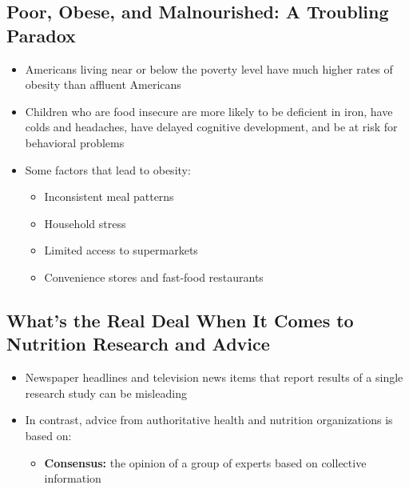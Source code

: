 \documentclass[12pt]{article}
\begin{document}
        \subsection{Poor, Obese, and Malnourished: A Troubling Paradox}
            \begin{itemize}
                \item Americans living near or below the poverty level have much higher rates of obesity than affluent Americans
                \item Children who are food insecure are more likely to be deficient in iron, have colds and headaches, have delayed cognitive development, and be at risk for behavioral problems
                \item Some factors that lead to obesity:
                    \begin{itemize}
                        \item Inconsistent meal patterns
                        \item Household stress
                        \item Limited access to supermarkets
                        \item Convenience stores and fast-food restaurants
                    \end{itemize}
            \end{itemize}

        \subsection{What's the Real Deal When It Comes to Nutrition Research and Advice}
            \begin{itemize}
                \item Newspaper headlines and television news items that report results of a single research study can be misleading
                \item In contrast, advice from authoritative health and nutrition organizations is based on:
                    \begin{itemize}
                        \item \textbf{Consensus:} the opinion of a group of experts based on collective information
                    \end{itemize}
            \end{itemize}
\end{document}
